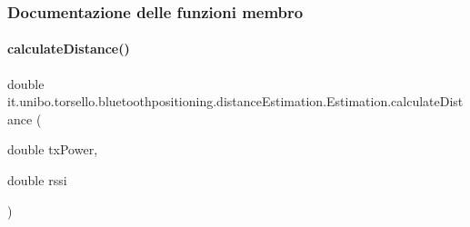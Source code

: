\subsubsection{Documentazione delle funzioni membro}
\hypertarget{classit_1_1unibo_1_1torsello_1_1bluetoothpositioning_1_1distanceEstimation_1_1Estimation_a6e33d4e0b776517a86c6aa87cd51b66b_a6e33d4e0b776517a86c6aa87cd51b66b}{}\label{classit_1_1unibo_1_1torsello_1_1bluetoothpositioning_1_1distanceEstimation_1_1Estimation_a6e33d4e0b776517a86c6aa87cd51b66b_a6e33d4e0b776517a86c6aa87cd51b66b} 
\paragraph{\texorpdfstring{calculate\+Distance()}{calculateDistance()}}
{\footnotesize\ttfamily double it.\+unibo.\+torsello.\+bluetoothpositioning.\+distance\+Estimation.\+Estimation.\+calculate\+Distance (\begin{DoxyParamCaption}\item[{double}]{tx\+Power,  }\item[{double}]{rssi }\end{DoxyParamCaption})\hspace{0.3cm}{\ttfamily [private]}}


